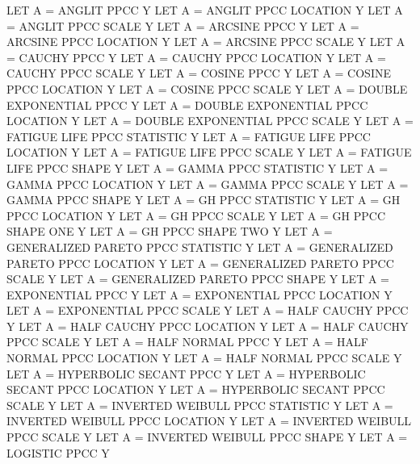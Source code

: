 {          LET A = ANGLIT PPCC                       Y
          LET A = ANGLIT PPCC LOCATION              Y
          LET A = ANGLIT PPCC SCALE                 Y
          LET A = ARCSINE PPCC                      Y
          LET A = ARCSINE PPCC LOCATION             Y
          LET A = ARCSINE PPCC SCALE                Y
          LET A = CAUCHY PPCC                       Y
          LET A = CAUCHY PPCC LOCATION              Y
          LET A = CAUCHY PPCC SCALE                 Y
          LET A = COSINE PPCC                       Y
          LET A = COSINE PPCC LOCATION              Y
          LET A = COSINE PPCC SCALE                 Y
          LET A = DOUBLE EXPONENTIAL PPCC           Y
          LET A = DOUBLE EXPONENTIAL PPCC LOCATION  Y
          LET A = DOUBLE EXPONENTIAL PPCC SCALE     Y
          LET A = FATIGUE LIFE PPCC STATISTIC       Y
          LET A = FATIGUE LIFE PPCC LOCATION        Y
          LET A = FATIGUE LIFE PPCC SCALE           Y
          LET A = FATIGUE LIFE PPCC SHAPE           Y
          LET A = GAMMA PPCC STATISTIC              Y
          LET A = GAMMA PPCC LOCATION               Y
          LET A = GAMMA PPCC SCALE                  Y
          LET A = GAMMA PPCC SHAPE                  Y
          LET A = GH PPCC STATISTIC                 Y
          LET A = GH PPCC LOCATION                  Y
          LET A = GH PPCC SCALE                     Y
          LET A = GH PPCC SHAPE ONE                 Y
          LET A = GH PPCC SHAPE TWO                 Y
          LET A = GENERALIZED PARETO PPCC STATISTIC Y
          LET A = GENERALIZED PARETO PPCC LOCATION  Y
          LET A = GENERALIZED PARETO PPCC SCALE     Y
          LET A = GENERALIZED PARETO PPCC SHAPE     Y
          LET A = EXPONENTIAL PPCC                  Y
          LET A = EXPONENTIAL PPCC LOCATION         Y
          LET A = EXPONENTIAL PPCC SCALE            Y
          LET A = HALF CAUCHY PPCC                  Y
          LET A = HALF CAUCHY PPCC LOCATION         Y
          LET A = HALF CAUCHY PPCC SCALE            Y
          LET A = HALF NORMAL PPCC                  Y
          LET A = HALF NORMAL PPCC LOCATION         Y
          LET A = HALF NORMAL PPCC SCALE            Y
          LET A = HYPERBOLIC SECANT PPCC            Y
          LET A = HYPERBOLIC SECANT PPCC LOCATION   Y
          LET A = HYPERBOLIC SECANT PPCC SCALE      Y
          LET A = INVERTED WEIBULL PPCC STATISTIC   Y
          LET A = INVERTED WEIBULL PPCC LOCATION    Y
          LET A = INVERTED WEIBULL PPCC SCALE       Y
          LET A = INVERTED WEIBULL PPCC SHAPE       Y
          LET A = LOGISTIC PPCC                     Y
}
